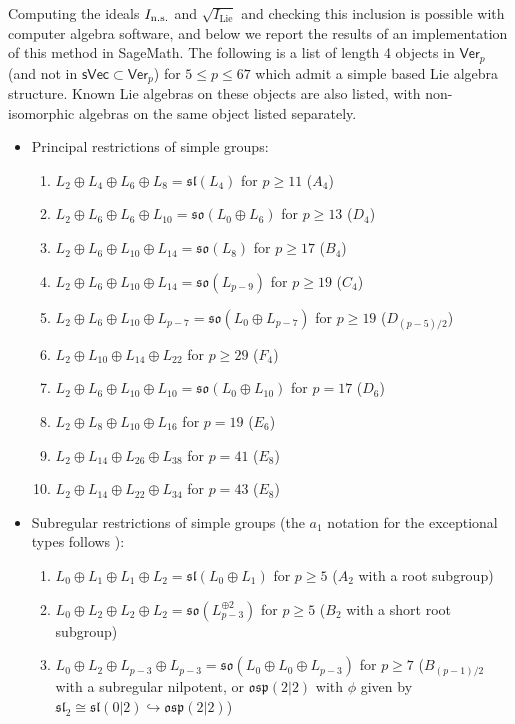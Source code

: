 \documentclass[11pt,a4paper,reqno]{amsart}
\theoremstyle{definition}
\numberwithin{equation}{section}
\newcommand{\Ver}{\mathsf{Ver}}
\newcommand{\fsl}{\mathfrak{sl}}
\newcommand{\fso}{\mathfrak{so}}
\newcommand{\fosp}{\mathfrak{osp}}
\newcommand{\Lie}{\mathrm{Lie}}
\newcommand{\sVec}{\mathsf{sVec}}
\begin{document}
Computing the ideals $I_{\rm n.s.}$ and $\sqrt{I_{\Lie}}$ and checking this inclusion is possible with computer algebra software, and below we report the results of an implementation of this method in SageMath. The following is a list of length 4 objects in $\Ver_p$ (and not in $\sVec\subset\Ver_p$) for $5\leq p\leq67$ which admit a simple based Lie algebra structure. Known Lie algebras on these objects are also listed, with non-isomorphic algebras on the same object listed separately.
\begin{itemize}
\item Principal restrictions of simple groups:
\begin{enumerate}
\item $L_2\oplus L_4\oplus L_6\oplus L_8=\fsl(L_4)$ for $p\geq11$ ($A_4$)
\item $L_2\oplus L_6\oplus L_6\oplus L_{10}=\fso(L_0\oplus L_6)$ for $p\geq13$ ($D_4$)
\item $L_2\oplus L_6\oplus L_{10}\oplus L_{14}=\fso(L_8)$ for $p\geq17$ ($B_4$)
\item $L_2\oplus L_6\oplus L_{10}\oplus L_{14}=\fso(L_{p-9})$ for $p\geq19$ ($C_4$)
\item $L_2\oplus L_6\oplus L_{10}\oplus L_{p-7}=\fso(L_0\oplus L_{p-7})$ for $p\geq19$ ($D_{(p-5)/2}$)
\item $L_2\oplus L_{10}\oplus L_{14}\oplus L_{22}$ for $p\geq29$ ($F_4$)
\item $L_2\oplus L_6\oplus L_{10}\oplus L_{10}=\fso(L_0\oplus L_{10})$ for $p=17$ ($D_6$)
\item $L_2\oplus L_8\oplus L_{10}\oplus L_{16}$ for $p=19$ ($E_6$)
\item $L_2\oplus L_{14}\oplus L_{26}\oplus L_{38}$ for $p=41$ ($E_8$)
\item $L_2\oplus L_{14}\oplus L_{22}\oplus L_{34}$ for $p=43$ ($E_8$)
\setcounter{length4counter}{\value{enumi}}
\end{enumerate}
\item Subregular restrictions of simple groups (the $a_1$ notation for the exceptional types follows \cite{St}):
\begin{enumerate}
\setcounter{enumi}{\value{length4counter}}
\item $L_0\oplus L_1\oplus L_1\oplus L_2=\fsl(L_0\oplus L_1)$ for $p\geq5$ ($A_2$ with a root subgroup)
\item $L_0\oplus L_2\oplus L_2\oplus L_2=\fso(L_{p-3}^{\oplus 2})$ for $p\geq5$ ($B_2$ with a short root subgroup)
\item\label{Item4B} $L_0\oplus L_2\oplus L_{p-3}\oplus L_{p-3}=\fso(L_0\oplus L_0\oplus L_{p-3})$ for $p\geq7$ ($B_{(p-1)/2}$ with a subregular nilpotent, or $\fosp(2|2)$ with $\phi$ given by $\fsl_2\cong\fsl(0|2)\hookrightarrow{\fosp(2|2)}$)

\end{enumerate}
\end{itemize}
\end{document}
